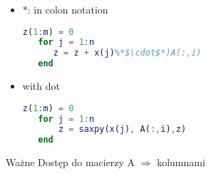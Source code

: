 \begin{frame}[fragile]
	\begin{itemize}
	\item $*$: in colon notation
 \begin{lstlisting}[belowskip=-1.4 \baselineskip, language=Matlab]
   z(1:m) = 0
   for j = 1:n
      z = z + x(j)%*$\cdot$*)A(:,i)
   end\end{lstlisting}

\item with dot
 \begin{lstlisting}[belowskip=-1.4 \baselineskip, language=Matlab]
   z(1:m) = 0
   for j = 1:n
       z = saxpy(x(j), A(:,i),z)
   end\end{lstlisting}
 \end{itemize}
\vspace{24px}
 \begin{alertblock}{Ważne}
Dostęp do macierzy A $\Rightarrow$ kolumnami
  \end{alertblock}

\end{frame}
